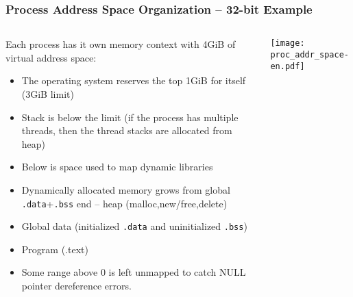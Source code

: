 \documentclass{beamer}
\begin{document}
\begin{frame}
\frametitle{Process Address Space Organization -- 32-bit Example}

\begin{columns}
\begin{column}{0.75\textwidth}
Each process has it own memory context with 4GiB of virtual address space:
\small
\begin{itemize}
\item The operating system reserves the top 1GiB for itself (3GiB limit)
\item Stack is below the limit (if the process has multiple threads, then the thread stacks are allocated from heap)
\item Below is space used to map dynamic libraries
\item Dynamically allocated memory grows from global \texttt{.data}+\texttt{.bss} end -- heap (malloc,new/free,delete)
\item Global data (initialized \texttt{.data} and uninitialized \texttt{.bss})
\item Program (.text)
\item Some range above 0 is left unmapped to catch NULL pointer dereference errors.
\end{itemize}
\end{column}   
\begin{column}{0.25\textwidth}  
\texttt{[image: proc\_addr\_space-en.pdf]}
\end{column}
\end{columns}
\end{frame}
\end{document}
